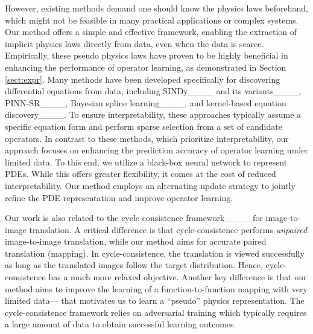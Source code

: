 However, existing methods demand one should know the physics laws beforehand, which might not be feasible in many practical applications or complex systems. Our method offers a simple and effective framework, enabling the extraction of implicit physics laws directly from data, even when the data is scarce. Empirically, these pseudo physics laws have proven to be highly beneficial in enhancing the performance of operator learning, as demonstrated in Section \ref{sect:expr}. Many methods have been developed specifically for discovering differential equations from data, including SINDy____  and its variants____, PINN-SR____, Bayesian spline learning____, and kernel-based equation discovery____. To ensure interpretability, these approaches typically assume a specific equation form and perform sparse selection from a set of candidate operators. In contrast to these methods, which prioritize interpretability, our approach focuses on enhancing the prediction accuracy of operator learning under limited data. To this end, we utilize a black-box neural network to represent PDEs. While this offers greater flexibility, it comes at the cost of reduced interpretability. Our method employs an alternating update strategy to jointly refine the PDE representation and improve operator learning.


Our work is also related to the cycle consistence framework____ for image-to-image translation. A critical difference is that cycle-consistence performs \textit{unpaired} image-to-image translation, while our method aims for accurate paired translation (mapping). In cycle-consistence, the translation is viewed successfully as long as the translated images follow the target distribution. Hence, cycle-consistence has a much more relaxed objective. Another key difference is that our method aims to improve the learning of a function-to-function mapping with very limited data--- that motivates us to learn a ``pseudo'' physics representation. The cycle-consistence framework relies on adversarial training which typically requires a large amount of data to obtain successful learning outcomes.


 

